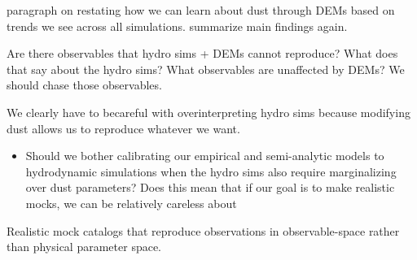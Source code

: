 


paragraph on restating how we can learn about dust through DEMs based on trends we see
across all simulations. summarize main findings again. 

Are there observables that hydro sims + DEMs cannot reproduce? What does that say about the hydro sims?
What observables are unaffected by DEMs? We should chase those observables. 

We clearly have to becareful with overinterpreting hydro sims because modifying
dust allows us to reproduce whatever we want. 
\begin{itemize}
    \item Should we bother calibrating our empirical and semi-analytic models
        to hydrodynamic simulations when the hydro sims also require
        marginalizing over dust parameters? Does this mean that if our goal is
        to make realistic mocks, we can be relatively careless about 
\end{itemize}

Realistic mock catalogs that reproduce observations in observable-space rather
than physical parameter space.   
